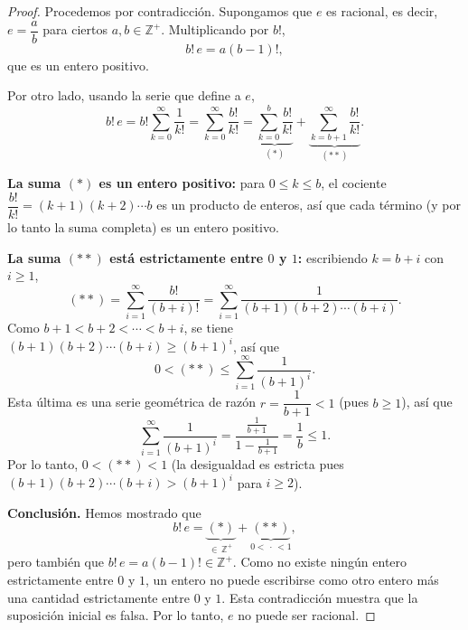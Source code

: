 \documentclass[12pt,a4paper]{book}
\begin{document}
  \begin{proof}
    Procedemos por contradicción. Supongamos que $e$ es racional, es decir, $e=\dfrac{a}{b}$ para ciertos $a,b\in\mathbb{Z}^+$. Multiplicando por $b!$,
    \begin{equation*}
      b!\,e = a(b-1)!,
    \end{equation*}
    que es un entero positivo.
  
    Por otro lado, usando la serie que define a $e$,
    \begin{equation*}
      b!\,e = b!\sum_{k=0}^{\infty}\frac{1}{k!} = \sum_{k=0}^{\infty}\frac{b!}{k!} = \underbrace{\sum_{k=0}^{b}\frac{b!}{k!}}_{(\ast)} + \underbrace{\sum_{k=b+1}^{\infty}\frac{b!}{k!}}_{(\ast\ast)}.
    \end{equation*}
  
    \textbf{La suma $(\ast)$ es un entero positivo:} para $0\leq k\leq b$, el cociente $\dfrac{b!}{k!}=(k+1)(k+2)\cdots b$ es un producto de enteros, así que cada término (y por lo tanto la suma completa) es un entero positivo.
  
    \textbf{La suma $(\ast\ast)$ está estrictamente entre $0$ y $1$:} escribiendo $k=b+i$ con $i\geq 1$,
    \begin{equation*}
      (\ast\ast) = \sum_{i=1}^{\infty}\frac{b!}{(b+i)!} = \sum_{i=1}^{\infty}\frac{1}{(b+1)(b+2)\cdots(b+i)}.
    \end{equation*}
    Como $b+1<b+2<\cdots<b+i$, se tiene $(b+1)(b+2)\cdots(b+i) \geq (b+1)^i$, así que
    \begin{equation*}
      0 < (\ast\ast) \leq \sum_{i=1}^{\infty}\frac{1}{(b+1)^i}.
    \end{equation*}
    Esta última es una serie geométrica de razón $r=\dfrac{1}{b+1}<1$ (pues $b\geq 1$), así que
    \begin{equation*}
      \sum_{i=1}^{\infty}\frac{1}{(b+1)^i} = \frac{\frac{1}{b+1}}{1-\frac{1}{b+1}} = \frac{1}{b} \leq 1.
    \end{equation*}
    Por lo tanto, $0<(\ast\ast)<1$ (la desigualdad es estricta pues $(b+1)(b+2)\cdots(b+i)>(b+1)^i$ para $i\geq 2$).
  
    \textbf{Conclusión.} Hemos mostrado que
    \begin{equation*}
      b!\,e = \underbrace{(\ast)}_{\in\,\mathbb{Z}^+} + \underbrace{(\ast\ast)}_{0<\,\cdot\,<1},
    \end{equation*}
    pero también que $b!\,e = a(b-1)!\in\mathbb{Z}^+$. Como no existe ningún entero estrictamente entre $0$ y $1$, un entero no puede escribirse como otro entero más una cantidad estrictamente entre $0$ y $1$. Esta contradicción muestra que la suposición inicial es falsa. Por lo tanto, $e$ no puede ser racional.
  \end{proof}
  
\end{document}
